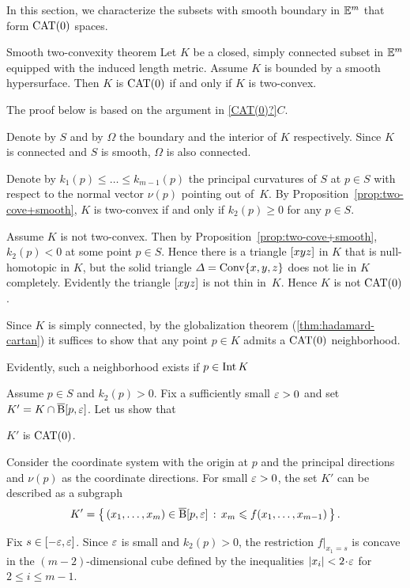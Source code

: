 In this section, we characterize the subsets with smooth boundary in $\mathbb{E}^m$ that form $\mathrm{CAT}(0)$ spaces. 

\begin{thm}{Smooth two-convexity theorem}\label{thm:set-with-smooth-bry:CBA}
Let $K$ be a closed, simply connected subset in $\mathbb{E}^m$ equipped with the induced length metric.
Assume $K$ is bounded by a smooth hypersurface.
Then 
$K$ is $\mathrm{CAT}(0)$ if and only if $K$ is two-convex.
\end{thm}

The proof below is based on the argument in \ref{CAT(0)?}$C$.

Denote by $S$ and by $\Omega$ the boundary and the interior of $K$ respectively. 
Since $K$ is connected and $S$ is smooth, $\Omega$ is also connected.

Denote by $k_1(p)\le\ldots\le k_{m-1}(p)$ the principal curvatures of $S$ at $p\in S$ with respect to the normal vector $\nu(p)$ pointing out of~$K$.
By Proposition~\ref{prop:two-cove+smooth}, $K$ is two-convex if and only if $k_2(p)\ge 0$ for any $p\in S$.

Assume $K$ is not two-convex.
Then by Proposition~\ref{prop:two-cove+smooth}, $k_2(p)<0$ at some point $p\in S$. Hence there is a triangle $[xyz]$ in $K$ that is null-homotopic in $K$, but the solid triangle $\varDelta=\mathop{\rm Conv}\nolimits\{x,y,z\}$ does not lie in $K$ completely.
Evidently the triangle $[xyz]$ is not thin in~$K$. 
Hence $K$ is not $\mathrm{CAT}(0)$.

Since $K$ is simply connected,
by the globalization theorem (\ref{thm:hadamard-cartan})
it suffices to show that any point $p\in K$ admits a $\mathrm{CAT}(0)$ neighborhood.

Evidently, such a neighborhood exists if $p\in\operatorname{\rm Int}\nolimits K$

Assume $p\in S$ and $k_2(p)>0$.
Fix a sufficiently small $\varepsilon>0$ and set $K'\z=K\cap \cBall[p,\eps]$.
Let us show that 
\begin{clm}{}\label{K'-is-CAT}
$K'$ is $\mathrm{CAT}(0)$.
\end{clm}

Consider the coordinate system with the origin at $p$
and the principal directions and $\nu(p)$ as the coordinate directions.
For small $\varepsilon>0$, the set $K'$ 
can be described as a subgraph
\[K'
=
\left\{\,{(x_1,\ldots,x_m)\in \overline{\mathrm{B}}{}[p,\varepsilon]}\,:\,{x_m\leqslant f(x_1,\ldots,x_{m-1})}\,\right\}.\]

Fix $s\in[-\varepsilon,\varepsilon]$.
Since $\varepsilon$ is small and $k_2(p)>0$, the restriction 
$f|_{x_1=s}$
is concave in the $(m-2)$-dimensional cube defined by the inequalities $|x_i|<2\cdot\eps$ for $2\le i\le m-1$.

